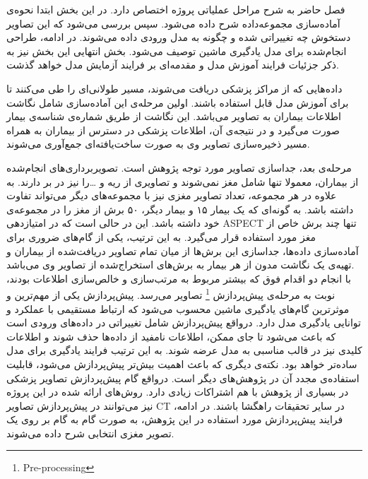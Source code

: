 

فصل حاضر به شرح مراحل عملیاتی پروژه اختصاص دارد.
در این بخش ابتدا نحوه‌ی آماده‌سازی مجموعه‌داده شرح داده می‌شود.
سپس بررسی می‌شود که این تصاویر دستخوش چه تغییراتی شده و چگونه به مدل ورودی داده می‌شوند.
در ادامه، طراحی انجام‌شده برای مدل یادگیری ماشین توصیف می‌شود.
بخش انتهایی این بخش نیز به ذکر 
جزئیات فرایند آموزش مدل و مقدمه‌ای بر فرایند آزمایش مدل خواهد گذشت.


داده‌هایی که از مراکز پزشکی دریافت می‌شوند، مسیر طولانی‌ای را طی می‌کنند تا برای آموزش مدل قابل استفاده باشند.
اولین مرحله‌ی این آماده‌سازی شامل نگاشت اطلاعات بیماران به تصاویر می‌باشد.
این نگاشت از طریق شماره‌ی شناسه‌ی بیمار صورت می‌گیرد 
و در نتیجه‌ی آن، اطلاعات پزشکی در دسترس از بیماران به همراه مسیر ذخیره‌سازی تصاویر وی به صورت ساخت‌یافته‌ای جمع‌آوری می‌شوند.\

مرحله‌ی بعد، جداسازی تصاویر مورد توجه پژوهش است.
تصویربرداری‌های انجام‌شده از بیماران، معمولا تنها شامل مغز نمی‌شوند و تصاویری از ریه و \dots را نیز در بر دارند.
به علاوه در هر مجموعه، تعداد تصاویر مغزی نیز با مجموعه‌های دیگر می‌تواند تفاوت داشته باشد.
به گونه‌ای که یک بیمار ۱۵ و بیمار دیگر، ۵۰ برش از مغز را در مجموعه‌ی خود داشته باشد.
این در حالی است که در امتیازدهی ASPECT تنها چند برش خاص از مغز مورد استفاده قرار می‌گیرد.
به این ترتیب، یکی از گام‌های ضروری برای آماده‌سازی داده‌ها، جداسازی این برش‌ها از میان تمام 
تصاویر دریافت‌شده از بیماران و تهیه‌ی یک نگاشت مدون از هر بیمار به برش‌های استخراج‌شده از تصاویر وی می‌باشد.\\

با انجام دو اقدام فوق که بیشتر مربوط به مرتب‌سازی و خالص‌سازی اطلاعات بودند، نوبت به مرحله‌ی پیش‌پردازش
\footnote{Pre-processing}
تصاویر می‌رسد.
پیش‌پردازش یکی از مهم‌ترین و موثرترین گام‌های یادگیری ماشین محسوب می‌شود که ارتباط مستقیمی با عملکرد و توانایی یادگیری مدل دارد. 
درواقع پیش‌پردازش شامل تغییراتی در داده‌های ورودی است که باعث می‌شود تا جای ممکن، اطلاعات نامفید از داد‌ه‌ها حذف شوند و اطلاعات کلیدی نیز در قالب مناسبی به مدل عرضه شوند.
به این ترتیب فرایند یادگیری برای مدل ساده‌تر خواهد بود.
نکته‌ی دیگری که باعث اهمیت بیش‌تر پیش‌پردازش می‌شود، قابلیت استفاده‌ی مجدد آن در پژوهش‌های دیگر است.
درواقع گام پیش‌پردازش تصاویر پزشکی در بسیاری از پژوهش با هم اشتراکات زیادی دارد.
روش‌های ارائه شده در این پروژه نیز می‌توانند در پیش‌پردازش تصاویر CT در سایر تحقیقات راهگشا باشند.
در ادامه، فرایند پیش‌پردازش مورد استفاده در این پژوهش، به صورت گام به گام بر روی یک تصویر مغزی انتخابی شرح داده می‌شوند.

